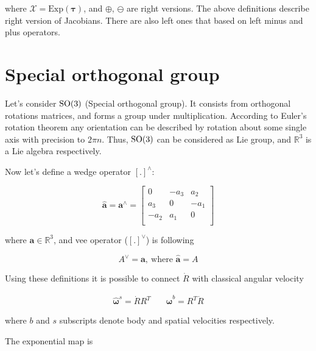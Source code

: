 where $\mathcal{X} = \text{Exp}(\boldsymbol{\tau})$, and $\oplus$, $\ominus$ 
are right versions. The above definitions describe right version of 
Jacobians. There are also left ones that based on left minus and plus 
operators.

\section{Special orthogonal group}

Let's consider $\text{SO}(3)$ (Special orthogonal group). It consists from orthogonal 
rotations matrices, and forms a group under multiplication. According to 
Euler's rotation theorem any orientation can be described by rotation 
about some single axis with precision to $2 \pi n$. Thus, $\text{SO}(3)$ can be 
considered as Lie group, and $\mathbb{R}^3$ is a Lie algebra respectively.

Now let's define a wedge operator $[.]^{\wedge}$:

\begin{equation}
    \hat{\mathbf{a}} = \mathbf{a}^{\wedge} = 
    \begin{bmatrix}
        0 & -a_3 & a_2 \\
        a_3 & 0 & -a_1 \\
        -a_2 & a_1 & 0 \\
    \end{bmatrix}
    \label{eqn:wedge_op}
\end{equation}

where $\mathbf{a} \in \mathbb{R}^3$, and vee operator ($[.]^{\vee}$) is 
following

\begin{equation}
    A^{\vee} = \mathbf{a}, \ \text{where }
    \hat{\mathbf{a}} = A
    \label{eqn:vee_op}
\end{equation}

Using these definitions it is possible to connect $\dot{R}$ with classical 
angular velocity

\begin{equation}
    \begin{aligned}
        \hat{\boldsymbol{\omega}}^s = \dot{R} R^T & \quad
        \hat{\boldsymbol{\omega}}^b = R^T \dot{R}
    \end{aligned}
    \label{eqn:ang_with_dot_r}
\end{equation}

where $b$ and $s$ subscripts denote body and spatial velocities 
respectively.

The exponential map is


